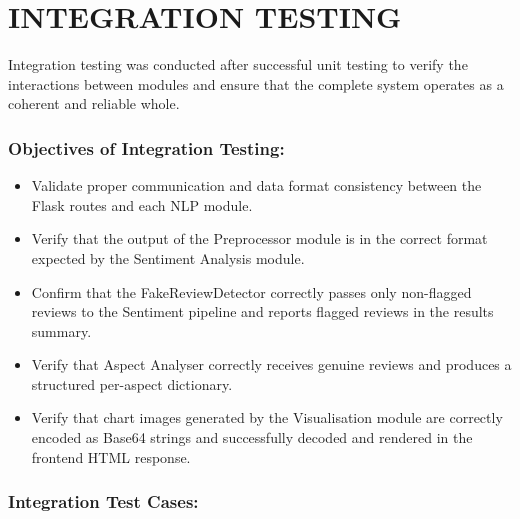 \documentclass[12pt,a4paper]{report}
\begin{document}
\section{INTEGRATION TESTING}

Integration testing was conducted after successful unit testing to verify the interactions between modules and ensure that the complete system operates as a coherent and reliable whole.

\subsubsection*{Objectives of Integration Testing:}

\begin{itemize}
  \item Validate proper communication and data format consistency between the Flask routes and each NLP module.
  \item Verify that the output of the Preprocessor module is in the correct format expected by the Sentiment Analysis module.
  \item Confirm that the FakeReviewDetector correctly passes only non-flagged reviews to the Sentiment pipeline and reports flagged reviews in the results summary.
  \item Verify that Aspect Analyser correctly receives genuine reviews and produces a structured per-aspect dictionary.
  \item Verify that chart images generated by the Visualisation module are correctly encoded as Base64 strings and successfully decoded and rendered in the frontend HTML response.
\end{itemize}

\subsubsection*{Integration Test Cases:}
\end{document}
